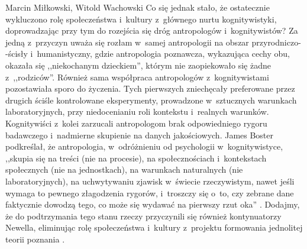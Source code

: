 \begin{artplenv2auth}{Marcin Miłkowski, Witold Wachowski}
Co się jednak stało, że ostatecznie wykluczono rolę społeczeństwa i~kultury z~głównego nurtu kognitywistyki, doprowadzając przy tym do rozejścia się dróg antropologów i~kognitywistów? Za jedną z~przyczyn uważa się rozłam w~samej antropologii na obszar przyrodniczo-\mbox{-ścisły} i~humanistyczny, gdzie antropologia poznawcza, wykazująca cechy obu, okazała się ,,niekochanym dzieckiem'', którym nie zaopiekowało się żadne z~,,rodziców''. Również sama współpraca antropologów z~kognitywistami pozostawiała sporo do życzenia. Tych pierwszych zniechęcały preferowane przez drugich ściśle kontrolowane eksperymenty, prowadzone w~sztucznych warunkach laboratoryjnych, przy niedocenianiu roli kontekstu i~realnych warunków. Kognitywiści z~kolei zarzucali antropologom brak odpowiedniego rygoru badawczego i~nadmierne skupienie na danych jakościowych. James Boster podkreślał, że antropologia, w~odróżnieniu od psychologii w~kognitywistyce, ,,skupia się na treści (nie na procesie), na społecznościach i~kontekstach społecznych (nie na jednostkach), na warunkach naturalnych (nie laboratoryjnych), na uchwytywaniu zjawisk w~świecie rzeczywistym, nawet jeśli wymaga to pewnego złagodzenia rygorów, i~troszczy się o~to, czy zebrane dane faktycznie dowodzą tego, co może się wydawać na pierwszy rzut oka''
\parencite[za ][s.~377; przekład własny]{bender_anthropology_2010}. %
 Dodajmy, że do podtrzymania tego stanu rzeczy przyczynili się również kontynuatorzy Newella, eliminując rolę społeczeństwa i~kultury z~projektu formowania jednolitej teorii poznania 
\parencites[][]{hutchins_cognition_1995}[][]{bender_anthropology_2010}[][]{anderson_newell_2003}[][]{kronenfeld_companion_2011}.%



\end{artplenv2auth}
